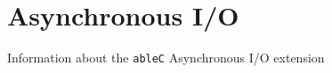 \documentclass[main.tex]{subfiles}
\begin{document}
\section*{Asynchronous I/O}
Information about the \verb|ableC| Asynchronous I/O extension
\end{document}
